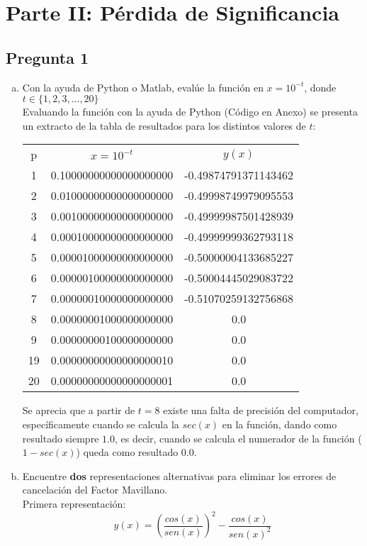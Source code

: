 \documentclass[10pt]{article}
\begin{document}
\section{Parte II: Pérdida de Significancia}

\subsection{Pregunta 1}
\begin{enumerate}[a)]
\item Con la ayuda de Python o Matlab, evalúe la función en $x=10^{-t}$, donde $t \in \{1, 2, 3,...,20\}$ \\
Evaluando la función con la ayuda de Python (Código en Anexo) se presenta un extracto de la tabla de resultados para los distintos valores de $t$:
\begin{center}
\begin{tabular}{|c|c|c|}
\cline{1-3}
p & $x=10^{-t}$ & $y(x)$  \\
\cline{1-3}
1 & 0.10000000000000000000 & -0.49874791371143462 \\
\cline{1-3}
2 & 0.01000000000000000000 & -0.49998749979095553 \\
\cline{1-3}
3 & 0.00100000000000000000 & -0.49999987501428939 \\
\cline{1-3}
4 & 0.00010000000000000000 & -0.49999999362793118 \\
\cline{1-3}
5 & 0.00001000000000000000 & -0.50000004133685227 \\
\cline{1-3}
6 & 0.00000100000000000000 & -0.50004445029083722 \\
\cline{1-3}
7 & 0.00000010000000000000 & -0.51070259132756868 \\
\cline{1-3}
8 & 0.00000001000000000000 & 0.0 \\
\cline{1-3}
9 & 0.00000000100000000000 & 0.0 \\
\cline{1-3}
19 & 0.00000000000000000010 & 0.0 \\
\cline{1-3}
20 & 0.00000000000000000001 & 0.0 \\
\cline{1-3}
\end{tabular}
\end{center}

Se aprecia que a partir de $t=8$ existe una falta de precisión del computador, específicamente cuando se calcula la $sec(x)$ en la función, dando como resultado siempre $1.0$, es decir, cuando se calcula el numerador de la función ($1-sec(x)$) queda como resultado $0.0$.

\item Encuentre \textbf{dos} representaciones alternativas para eliminar los errores de cancelación del Factor Mavillano. \\
Primera representación:
$$y(x)= \left(\frac{cos(x)}{sen(x)}\right)^2 - \frac{cos(x)}{sen(x)^2}$$


\end{enumerate}
\end{document}
